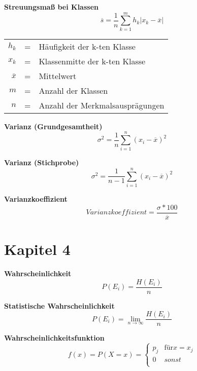 \documentclass[11pt,twocolumn,fleqn]{article}
\begin{document}
\textbf{Streuungsmaß bei Klassen}
\begin{equation*}
\overline{s}=\frac{1}{n}\sum^m_{k=1}h_k|x_k-\overline{x}|
\end{equation*}
\begin{center}\begin{tabular}{rcl}
   $h_k$ & = & Häufigkeit der k-ten Klasse  \\
   $x_k$ & = & Klassenmitte der k-ten Klasse \\
   $\overline{x}$ & = & Mittelwert \\
   $m$   & = & Anzahl der Klassen \\
   $n$   & = &  Anzahl der Merkmalsausprägungen \\
\end{tabular}\end{center}

\textbf{Varianz (Grundgesamtheit)}
\begin{equation*}
\sigma^2=\frac{1}{n}\sum^n_{i=1}(x_i-\overline{x})^2
\end{equation*}

\textbf{Varianz (Stichprobe)}
\begin{equation*}
\sigma^2=\frac{1}{n-1}\sum^n_{i=1}(x_i-\overline{x})^2
\end{equation*}

\textbf{Varianzkoeffizient}
\begin{equation*}
Varianzkoeffizient = \frac{\sigma * 100}{\overline{x} } 
\end{equation*}


\section{Kapitel 4}

\textbf{Wahrscheinlichkeit}
\begin{equation*}
P(E_i)=\frac{H(E_i)}{n}
\end{equation*}

\textbf{Statistische Wahrscheinlichkeit}
\begin{equation*}
P(E_i)= \lim_{n \to \infty} \frac{H(E_i)}{n}
\end{equation*}

\textbf{Wahrscheinlichkeitsfunktion}
\begin{equation*}
f(x)=P(X=x)= \begin{cases} 
p_j & \text{für}  x = x_j \\ 
0 & sonst  \\ 
\end{cases}
\end{equation*}
\end{document}
